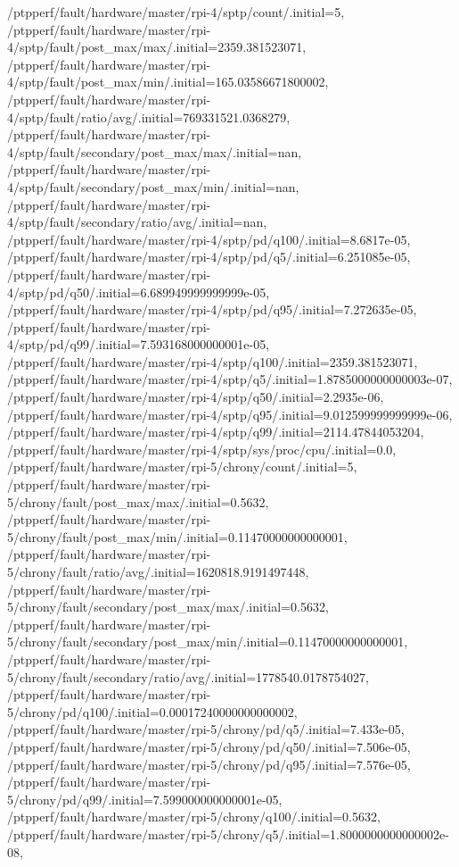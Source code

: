{    /ptpperf/fault/hardware/master/rpi-4/sptp/count/.initial=5,
    /ptpperf/fault/hardware/master/rpi-4/sptp/fault/post_max/max/.initial=2359.381523071,
    /ptpperf/fault/hardware/master/rpi-4/sptp/fault/post_max/min/.initial=165.03586671800002,
    /ptpperf/fault/hardware/master/rpi-4/sptp/fault/ratio/avg/.initial=769331521.0368279,
    /ptpperf/fault/hardware/master/rpi-4/sptp/fault/secondary/post_max/max/.initial=nan,
    /ptpperf/fault/hardware/master/rpi-4/sptp/fault/secondary/post_max/min/.initial=nan,
    /ptpperf/fault/hardware/master/rpi-4/sptp/fault/secondary/ratio/avg/.initial=nan,
    /ptpperf/fault/hardware/master/rpi-4/sptp/pd/q100/.initial=8.6817e-05,
    /ptpperf/fault/hardware/master/rpi-4/sptp/pd/q5/.initial=6.251085e-05,
    /ptpperf/fault/hardware/master/rpi-4/sptp/pd/q50/.initial=6.689949999999999e-05,
    /ptpperf/fault/hardware/master/rpi-4/sptp/pd/q95/.initial=7.272635e-05,
    /ptpperf/fault/hardware/master/rpi-4/sptp/pd/q99/.initial=7.593168000000001e-05,
    /ptpperf/fault/hardware/master/rpi-4/sptp/q100/.initial=2359.381523071,
    /ptpperf/fault/hardware/master/rpi-4/sptp/q5/.initial=1.8785000000000003e-07,
    /ptpperf/fault/hardware/master/rpi-4/sptp/q50/.initial=2.2935e-06,
    /ptpperf/fault/hardware/master/rpi-4/sptp/q95/.initial=9.012599999999999e-06,
    /ptpperf/fault/hardware/master/rpi-4/sptp/q99/.initial=2114.47844053204,
    /ptpperf/fault/hardware/master/rpi-4/sptp/sys/proc/cpu/.initial=0.0,
    /ptpperf/fault/hardware/master/rpi-5/chrony/count/.initial=5,
    /ptpperf/fault/hardware/master/rpi-5/chrony/fault/post_max/max/.initial=0.5632,
    /ptpperf/fault/hardware/master/rpi-5/chrony/fault/post_max/min/.initial=0.11470000000000001,
    /ptpperf/fault/hardware/master/rpi-5/chrony/fault/ratio/avg/.initial=1620818.9191497448,
    /ptpperf/fault/hardware/master/rpi-5/chrony/fault/secondary/post_max/max/.initial=0.5632,
    /ptpperf/fault/hardware/master/rpi-5/chrony/fault/secondary/post_max/min/.initial=0.11470000000000001,
    /ptpperf/fault/hardware/master/rpi-5/chrony/fault/secondary/ratio/avg/.initial=1778540.0178754027,
    /ptpperf/fault/hardware/master/rpi-5/chrony/pd/q100/.initial=0.00017240000000000002,
    /ptpperf/fault/hardware/master/rpi-5/chrony/pd/q5/.initial=7.433e-05,
    /ptpperf/fault/hardware/master/rpi-5/chrony/pd/q50/.initial=7.506e-05,
    /ptpperf/fault/hardware/master/rpi-5/chrony/pd/q95/.initial=7.576e-05,
    /ptpperf/fault/hardware/master/rpi-5/chrony/pd/q99/.initial=7.599000000000001e-05,
    /ptpperf/fault/hardware/master/rpi-5/chrony/q100/.initial=0.5632,
    /ptpperf/fault/hardware/master/rpi-5/chrony/q5/.initial=1.8000000000000002e-08,
}
